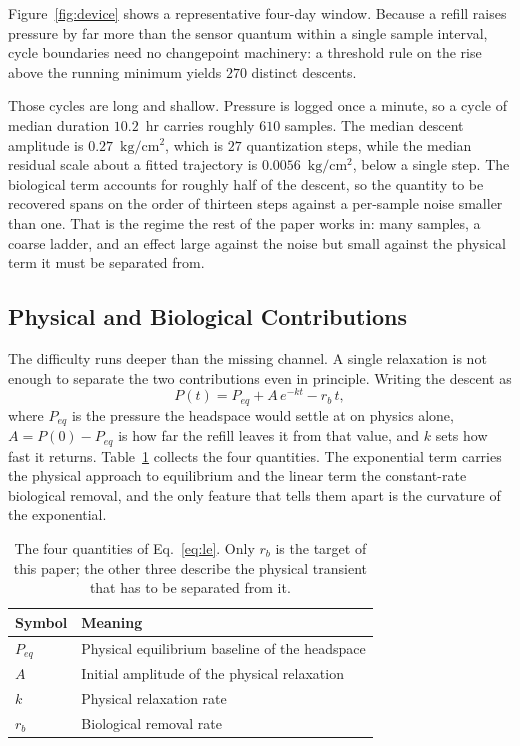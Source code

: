 \documentclass[runningheads]{llncs}
\newcommand{\pu}{\ensuremath{\mathrm{kg/cm^{2}}}}
\newcommand{\rb}{\ensuremath{r_{b}}}
\begin{document}
Figure~\ref{fig:device} shows a representative four-day window. Because a refill raises
pressure by far more than the sensor quantum within a single sample
interval, cycle boundaries need no changepoint machinery: a threshold
rule on the rise above the running minimum yields $270$ distinct
descents.

Those cycles are long and shallow. Pressure is logged once a minute, so
a cycle of median duration $10.2$~hr carries roughly $610$ samples. The
median descent amplitude is $0.27$~\pu{}, which is $27$ quantization
steps, while the median residual scale about a fitted trajectory is
$0.0056$~\pu{}, below a single step. The biological term accounts for
roughly half of the descent, so the quantity to be recovered spans on
the order of thirteen steps against a per-sample noise smaller than
one.
That is the regime the rest of the paper works in: many samples, a
coarse ladder, and an effect large against the noise but small against
the physical term it must be separated from.

\subsection{Physical and Biological Contributions}

The difficulty runs deeper than the missing channel. A single
relaxation is not enough to separate the two contributions even in
principle. Writing the descent as
\begin{equation}
P(t)=P_{eq}+A\,e^{-kt}-\rb\,t ,
\label{eq:le}
\end{equation}
where $P_{eq}$ is the pressure the headspace would settle at on physics
alone, $A=P(0)-P_{eq}$ is how far the refill leaves it from that value,
and $k$ sets how fast it returns. Table~\ref{tab:params} collects the
four quantities. The exponential term carries the physical approach to
equilibrium and the linear term the constant-rate biological removal,
and the only feature that tells them apart is the curvature of the
exponential.

\begin{table}[t]
\caption{The four quantities of Eq.~\eqref{eq:le}. Only \rb{} is the
target of this paper; the other three describe the physical transient
that has to be separated from it.}
\label{tab:params}
\centering
\begin{tabular}{ll}
\toprule
Symbol & Meaning \\
\midrule
$P_{eq}$ & Physical equilibrium baseline of the headspace \\
$A$      & Initial amplitude of the physical relaxation \\
$k$      & Physical relaxation rate \\
\rb{}    & Biological removal rate \\
\bottomrule
\end{tabular}
\end{table}
\end{document}
